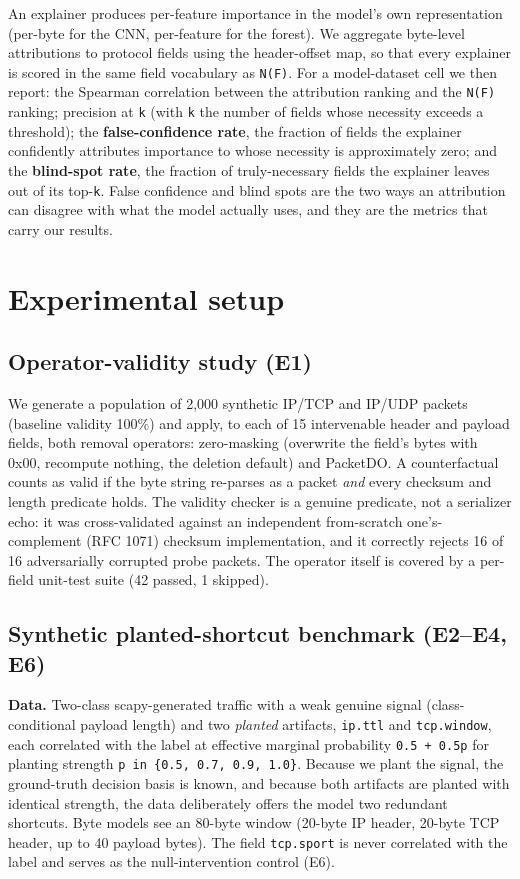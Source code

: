 \documentclass[journal]{IEEEtran}
\begin{document}
An explainer produces per-feature importance in the model's own
representation (per-byte for the CNN, per-feature for the forest). We
aggregate byte-level attributions to protocol fields using the
header-offset map, so that every explainer is scored in the same field
vocabulary as \texttt{N(F)}. For a model-dataset cell we then report:
the Spearman correlation between the attribution ranking and the
\texttt{N(F)} ranking; precision at \texttt{k} (with \texttt{k} the
number of fields whose necessity exceeds a threshold); the
\textbf{false-confidence rate}, the fraction of fields the explainer
confidently attributes importance to whose necessity is approximately
zero; and the \textbf{blind-spot rate}, the fraction of truly-necessary
fields the explainer leaves out of its top-\texttt{k}. False confidence
and blind spots are the two ways an attribution can disagree with what
the model actually uses, and they are the metrics that carry our
results.

\section{Experimental setup}

\subsection{Operator-validity study (E1)}

We generate a population of 2,000 synthetic IP/TCP and IP/UDP packets
(baseline validity 100\%) and apply, to each of 15 intervenable header
and payload fields, both removal operators: zero-masking (overwrite the
field's bytes with 0x00, recompute nothing, the deletion default) and
PacketDO. A counterfactual counts as valid if the byte string re-parses
as a packet \emph{and} every checksum and length predicate holds. The
validity checker is a genuine predicate, not a serializer echo: it was
cross-validated against an independent from-scratch one's-complement
(RFC 1071) checksum implementation, and it correctly rejects 16 of 16
adversarially corrupted probe packets. The operator itself is covered by
a per-field unit-test suite (42 passed, 1 skipped).

\subsection{Synthetic planted-shortcut benchmark (E2--E4, E6)}

\textbf{Data.} Two-class scapy-generated traffic with a weak genuine
signal (class-conditional payload length) and two \emph{planted}
artifacts, \texttt{ip.ttl} and \texttt{tcp.window}, each correlated with
the label at effective marginal probability \texttt{0.5\ +\ 0.5p} for
planting strength \texttt{p\ in\ \{0.5,\ 0.7,\ 0.9,\ 1.0\}}. Because we
plant the signal, the ground-truth decision basis is known, and because
both artifacts are planted with identical strength, the data
deliberately offers the model two redundant shortcuts. Byte models see
an 80-byte window (20-byte IP header, 20-byte TCP header, up to 40
payload bytes). The field \texttt{tcp.sport} is never correlated with
the label and serves as the null-intervention control (E6).
\end{document}
